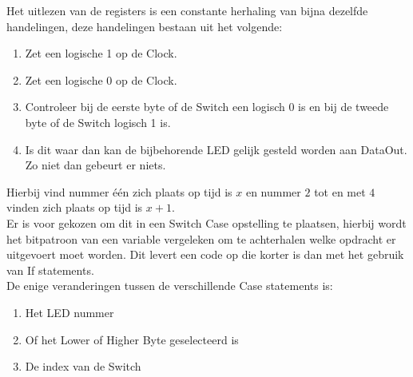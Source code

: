 Het uitlezen van de registers is een constante herhaling van bijna dezelfde handelingen, deze handelingen bestaan uit het volgende:
\begin{enumerate}
	\item Zet een logische 1 op de Clock.
	\item Zet een logische 0 op de Clock. 
	\item Controleer bij de eerste byte of de Switch een logisch 0 is en bij de tweede byte of de Switch logisch 1 is.
	\item Is dit waar dan kan de bijbehorende LED gelijk gesteld worden aan DataOut.
	Zo niet dan gebeurt er niets.
\end{enumerate}
Hierbij vind nummer één zich plaats op tijd is $x$ en nummer $2$ tot en met $4$ vinden zich plaats op tijd is $x + 1$.\\ 

Er is voor gekozen om dit in een Switch Case opstelling te plaatsen, hierbij wordt het bitpatroon van een variable vergeleken om te achterhalen welke opdracht er uitgevoert moet worden. Dit levert een code op die korter is dan met het gebruik van If statements.\\

De enige veranderingen tussen de verschillende Case statements is:
\begin{enumerate}
	\item Het LED nummer
	\item Of het Lower of Higher Byte geselecteerd is
	\item De index van de Switch
\end{enumerate}

